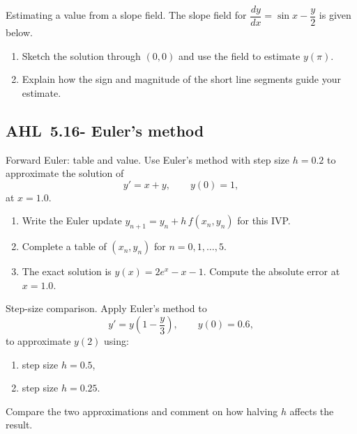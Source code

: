 \documentclass[11pt]{article}
\def\textbf#1{#1}%
\newcommand{\tocsubsection}[1]{\subsection{#1}}
\newcounter{question}
\begin{document}
\begin{question}
\textbf{Estimating a value from a slope field.}
The slope field for $\dfrac{dy}{dx}=\sin x-\dfrac{y}{2}$ is given below.
\begin{enumerate}
  \item Sketch the solution through $(0,0)$ and use the field to estimate $y(\pi)$.
  \item Explain how the sign and magnitude of the short line segments guide your estimate.
\end{enumerate}

\begin{center}
\end{center}
\end{question}




\tocsubsection{AHL 5.16- Euler's method}

\begin{question}
\textbf{Forward Euler: table and value.}
Use Euler’s method with step size $h=0.2$ to approximate the solution of
\[
y' = x+y,\qquad y(0)=1,
\]
at $x=1.0$. 
\begin{enumerate}
  \item Write the Euler update $y_{n+1}=y_n+h\,f(x_n,y_n)$ for this IVP.
  \item Complete a table of $(x_n,y_n)$ for $n=0,1,\dots,5$.
  \item The exact solution is $y(x)=2e^{x}-x-1$. Compute the absolute error at $x=1.0$.
\end{enumerate}
\end{question}

\begin{question}
\textbf{Step-size comparison.}
Apply Euler’s method to
\[
y' = y\!\left(1-\frac{y}{3}\right),\qquad y(0)=0.6,
\]
to approximate $y(2)$ using:
\begin{enumerate}
  \item step size $h=0.5$,
  \item step size $h=0.25$.
\end{enumerate}
Compare the two approximations and comment on how halving $h$ affects the result.
\end{question}
\end{document}
